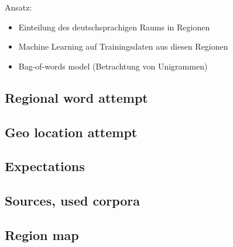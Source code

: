 \documentclass[../Main.tex]{subfiles}
\begin{document}
Ansatz:
\begin{itemize}
\item Einteilung des deutschsprachigen Raums in Regionen
\item Machine Learning auf Trainingsdaten aus diesen Regionen
\item Bag-of-words model (Betrachtung von Unigrammen)
\end{itemize}

\subsection{Regional word attempt}
\subsection{Geo location attempt}
\subsection{Expectations}
\subsection{Sources, used corpora}
\subsection{Region map}
\end{document}
